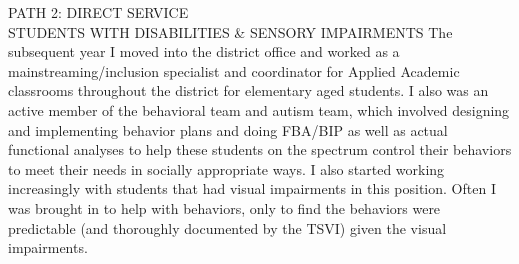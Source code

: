 \documentclass{resume} %
\begin{document}
\begin{rSection}{PATH 2: DIRECT SERVICE\\STUDENTS WITH DISABILITIES \& SENSORY IMPAIRMENTS}
The subsequent year I moved into the district office and worked as a mainstreaming/inclusion specialist and coordinator for Applied Academic classrooms throughout the district for elementary aged students. I also was an active member of the behavioral team and autism team, which involved designing and implementing behavior plans and doing FBA/BIP as well as actual functional analyses to help these students on the spectrum control their behaviors to meet their needs in socially appropriate ways. I also started working increasingly with students that had visual impairments in this position. Often I was brought in to help with behaviors, only to find the behaviors were predictable (and thoroughly documented by the TSVI) given the visual impairments.

\end{rSection}
\end{document}
